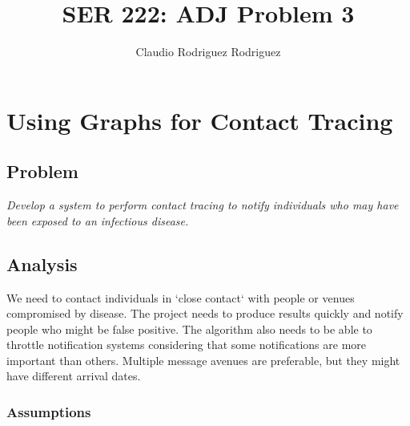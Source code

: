\documentclass{article}
\begin{document}
\title{SER 222: ADJ Problem 3}
\author{Claudio Rodriguez Rodriguez}
\maketitle







\section{Using Graphs for Contact Tracing}

\subsection{Problem}

\textit{Develop a system to perform contact tracing to notify individuals who may have been exposed to an infectious disease.}

\subsection{Analysis}

We need to contact individuals in `close contact` with people or venues compromised by disease. The project needs to produce results quickly and notify people who might be false positive. The algorithm also needs to be able to throttle notification systems considering that some notifications are more important than others. Multiple message avenues are preferable, but they might have different arrival dates. 

\subsubsection{Assumptions}
\end{document}
